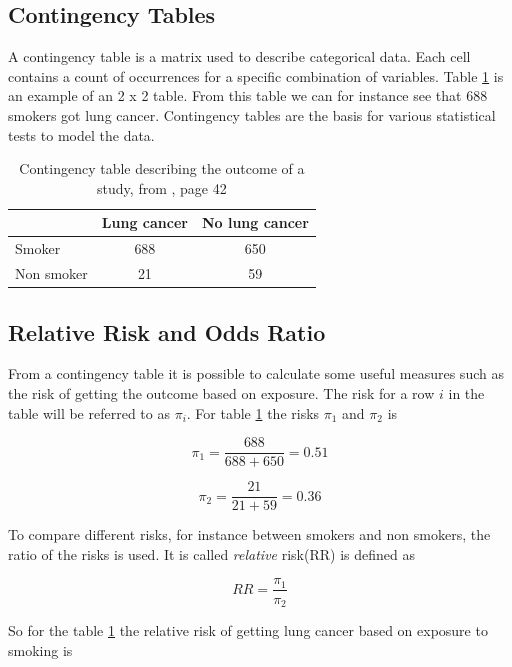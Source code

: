 \documentclass[10pt,a4paper]{report}
\begin{document}
\subsection{Contingency Tables}
A contingency table is a matrix used to describe categorical data. Each cell contains a count of occurrences for a specific combination of variables. Table \ref{table:contingency_table} is an example of an 2 x 2 table. From this table we can for instance see that 688 smokers got lung cancer. Contingency tables are the basis for various statistical tests to model the data.\cite{agresti_categorical}

\begin{table}[h]
\begin{tabular}{| l c c |}
  \hline
  & Lung cancer & No lung cancer\\
  \hline
  Smoker & 688 & 650 \\
  Non smoker & 21 & 59 \\
  \hline  
\end{tabular}
\caption{Contingency table describing the outcome of a study, from \cite{agresti_categorical}, page 42}
\label{table:contingency_table}
\end{table}

\subsection{Relative Risk and Odds Ratio}
\label{rr_or}
From a contingency table it is possible to calculate some useful measures such as the risk of getting the outcome based on exposure. The risk for a row $i$ in the table will be referred to as $\pi_i$. For table \ref{table:contingency_table} the risks $\pi_1$ and $\pi_2$ is

\begin{equation}
\pi_1=\frac{688}{688+650}=0.51
\end{equation}

\begin{equation}
\pi_2=\frac{21}{21+59}=0.36
\end{equation}

To compare different risks, for instance between smokers and non smokers, the ratio of the risks is used\cite{agresti_categorical}. It is called \emph{relative} risk(RR) is defined as\cite{agresti_categorical} 

\begin{equation}
RR=\frac{\pi_1}{\pi_2}
\end{equation}

So for the table \ref{table:contingency_table} the relative risk of getting lung cancer based on exposure to smoking is
\end{document}
